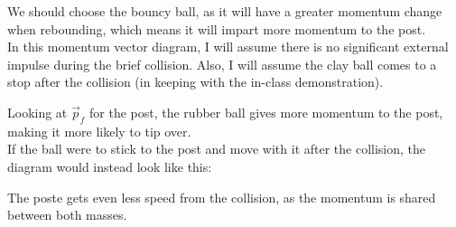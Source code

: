 \documentclass[]{article}
\begin{document}
\begin{TeacherMargin}
\noindent We should choose the bouncy ball, as it will have a greater momentum change when rebounding, which means it will impart more momentum to the post. \\

\noindent In this momentum vector diagram, I will assume there is no significant external impulse during the brief collision. Also, I will assume the clay ball comes to a stop after the collision (in keeping with the in-class demonstration).
\begin{center}
	\newcommand{\EntrySplit}[1]{
	\coordinate[shift={(0,0.25)}] (#1up) at (#1);
	\coordinate[shift={(0,-0.25)}] (#1dn) at (#1);
	}
\end{center}
Looking at $\vec{p}_{f}$ for the post, the rubber ball gives more momentum to the post, making it more likely to tip over. \\

\noindent If the ball were to stick to the post and move with it after the collision, the diagram would instead look like this:
\begin{center}
	\newcommand{\EntrySplit}[1]{
		\coordinate[shift={(0,0.25)}] (#1up) at (#1);
		\coordinate[shift={(0,-0.25)}] (#1dn) at (#1);
	}
\end{center}
The poste gets even less speed from the collision, as the momentum is shared between both masses.
\end{TeacherMargin}
\end{document}
